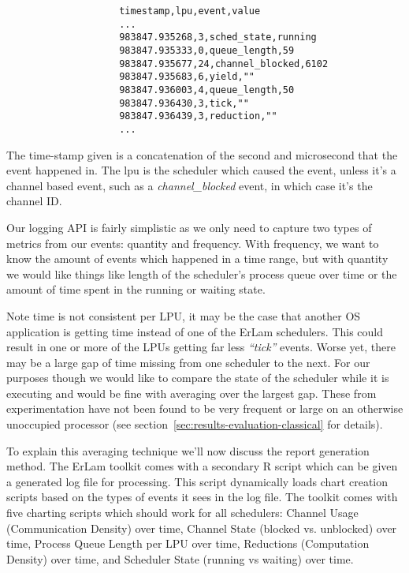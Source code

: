 {\footnotesize
\begin{verbatim}
                    timestamp,lpu,event,value
                    ...
                    983847.935268,3,sched_state,running
                    983847.935333,0,queue_length,59
                    983847.935677,24,channel_blocked,6102
                    983847.935683,6,yield,""
                    983847.936003,4,queue_length,50
                    983847.936430,3,tick,""
                    983847.936439,3,reduction,""
                    ...
\end{verbatim}
}
\noindent
The time-stamp given is a concatenation of the second and microsecond that the
event happened in. The lpu is the scheduler which caused the event, unless it's
a channel based event, such as a \emph{channel\_blocked} event, in which case it's
the channel ID. 

Our logging API is fairly simplistic as we only need to capture two types of metrics
from our events: quantity and frequency. With frequency, we want to know the
amount of events which happened in a time range, but with quantity we would like 
things like length of the scheduler's process queue over time or the amount of
time spent in the running or waiting state.

Note time is not consistent per LPU, it may be the case that another OS 
application is getting time instead of one of the ErLam schedulers. This could
result in one or more of the LPUs getting far less \emph{``tick''} events. Worse
yet, there may be a large gap of time missing from one scheduler to the next.
For our purposes though we would like to compare the state of the scheduler
while it is executing and would be fine with averaging over the largest gap. These
from experimentation have not been found to be very frequent or large on an
otherwise unoccupied processor (see section~\ref{sec:results-evaluation-classical} 
for details).

To explain this averaging technique we'll now discuss the report generation 
method. The ErLam toolkit comes with a secondary R script which can be given a 
generated log file for processing. This script dynamically loads chart 
creation scripts based on the types of events it sees in the log file. The
toolkit comes with five charting scripts which should work for all schedulers: 
Channel Usage (Communication Density) over time,
Channel State (blocked vs. unblocked) over time,
Process Queue Length per LPU over time,
Reductions (Computation Density) over time, and
Scheduler State (running vs waiting) over time.

